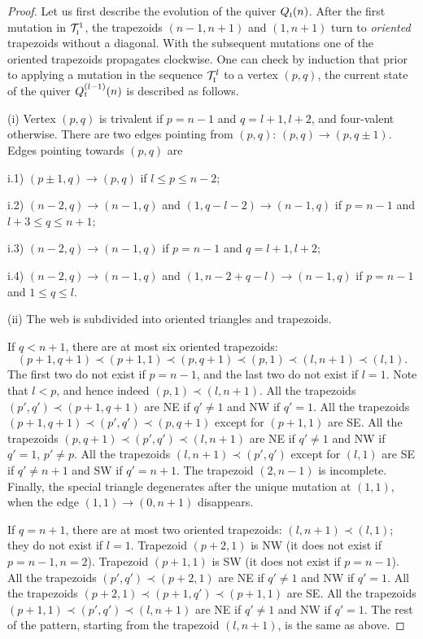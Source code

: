\documentclass{amsart}
\theoremstyle{definition}
\theoremstyle{remark}
\numberwithin{equation}{section}
\numberwithin{theorem}{section}
\begin{document}
\begin{proof}
Let us first describe the evolution of the quiver $Q_{\mbox{\tiny\rm I}}(n)$. 
After the first mutation in ${{\mathcal T}}^1_{\mbox{\tiny\rm I}}$, the trapezoids $(n-1,n+1)$ and $(1,n+1)$
turn to {\it oriented\/} trapezoids without a diagonal. With the subsequent mutations one of the oriented trapezoids propagates clockwise. 
One can check by induction that prior to applying a mutation in the sequence ${{\mathcal T}}^l_{\mbox{\tiny\rm I}}$ 
to a vertex $(p,q)$, the current state of the quiver $Q^{(l-1)}_{\mbox{\tiny\rm I}}(n)$ is described as follows.

(i) Vertex $(p,q)$  is trivalent if $p=n-1$ and $q=l+1, l+2$, and four-valent otherwise.
There are two edges pointing from $(p,q)$: $(p,q) \to (p,q\pm 1)$. 
Edges pointing towards $(p,q)$ are

i.1) $(p\pm 1, q) \to (p,q)$ if $ l \leq p \leq n-2$;

i.2) $(n- 2, q) \to (n-1,q)$ and $(1, q-l-2) \to (n-1,q)$ if $p=n-1$ and $l+3\leq q \leq n+1$;

i.3) $(n- 2, q) \to (n-1,q)$  if $p=n-1$ and $ q=l+1, l+ 2$;

i.4) $(n- 2, q) \to (n-1,q)$ and $(1, n-2+q-l) \to (n-1,q)$ if $p=n-1$ and $1\leq q \leq l$.

(ii) The web is subdivided into  oriented triangles and trapezoids. 

If $q<n+1$, there are at most six oriented trapezoids: 
$$
(p+1,q+1)\prec(p+1,1)\prec(p,q+1)\prec(p,1)\prec(l,n+1)\prec(l,1).
$$
The first two do not exist if $p=n-1$, and the last two do not exist if $l=1$.
Note that $l<p$, and hence indeed  $(p,1)\prec (l,n+1)$. 
All the trapezoids  $(p',q')\prec(p+1,q+1)$  are NE if $q'\ne 1$ and NW if $q'=1$.
All the trapezoids $(p+1,q+1)\prec(p',q')\prec (p,q+1)$ except for $(p+1,1)$ are SE.
All the trapezoids $(p,q+1)\prec(p',q')\prec(l,n+1)$ are NE if $q'\ne1$ and NW if $q'=1$, $p'\ne p$.
All the trapezoids $(l,n+1)\prec(p',q')$ except for $(l,1)$ are SE if $q'\ne n+1$ and SW if $q'=n+1$.
The trapezoid   $(2,n-1)$ is incomplete. Finally, the special triangle
degenerates after the unique mutation at $(1,1)$, when the edge $(1,1)\to (0,n+1)$ disappears.

If $q=n+1$, there are at most two oriented trapezoids: $(l,n+1)\prec(l,1)$; they do not exist if $l=1$.
Trapezoid $(p+2,1)$ is NW (it does not exist if $p=n-1, n=2$). Trapezoid $(p+1,1)$ is SW (it does not exist
if $p=n-1$). All the trapezoids  $(p',q')\prec(p+2,1)$  are NE if $q'\ne 1$ and NW if $q'=1$.
All the trapezoids $(p+2,1)\prec(p+1,q')\prec (p+1,1)$ are SE. All the trapezoids $(p+1,1)\prec(p',q')\prec(l,n+1)$ are NE if $q'\ne1$ and NW if $q'=1$.
The rest of the pattern, starting from the trapezoid $(l,n+1)$, is the same as above.


\end{proof}
\end{document}
